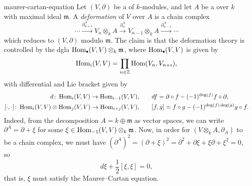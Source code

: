 \begin{example}{maurer-cartan-equation}
    Let $(V, \partial)$ be a  of $k$-modules, and let $A$ be a   over $k$ with maximal ideal $\mathfrak{m}$. A \textit{deformation} of $V$ over $A$ is a chain complex
    \[ \cdots \xrightarrow{\partial^A_{n + 1}} V_n \otimes_k A \xrightarrow{\partial^A_n} V_{n - 1} \otimes_k A \xrightarrow{\partial^A_{n - 1}} \cdots \]
    which reduces to $(V, \partial)$ modulo $\mathfrak{m}$. The claim is that the deformation theory is controlled by the dgla $\Hom_\bdot(V, V) \otimes_k \mathfrak{m}$, where $\Hom_\bdot(V, V)$ is given by
    \[ \operatorname{Hom}_i(V, V) = \prod_{n \in \mathbb{Z}} \operatorname{Hom}(V_n, V_{n + i}) , \]
    with differential and Lie bracket given by
    \[ \begin{aligned}
        d \colon \operatorname{Hom}_i(V, V) \to \operatorname{Hom}_{i - 1}(V, V), &\qquad df = \partial \circ f - (-1)^{\deg(f)} f \circ \partial , \\
        [ \cdot, \cdot ] \colon \operatorname{Hom}_i(V, V) \otimes \operatorname{Hom}_j(V, V) \to \operatorname{Hom}_{i + j}(V, V), &\qquad [f, g] = f \circ g - (-1)^{\deg(f) \deg(g)} g \circ f .
    \end{aligned} \]
    Indeed, from the decomposition $A = k \oplus \mathfrak{m}$ as vector spaces, we can write $\partial^A = \partial + \xi$ for some $\xi \in \operatorname{Hom}_{-1}(V, V) \otimes_k \mathfrak{m}$. Now, in order for $(V \otimes_k A, \partial_A)$ to be a chain complex, we must have $(\partial^A)^2 = (\partial + \xi)^2 = \partial^2 + \partial \xi + \xi \partial + \xi^2 = 0$, so
    \[ d \xi + \frac{1}{2} [\xi, \xi] = 0 , \]
    that is, $\xi$ must satisfy the Maurer--Cartan equation.
\end{example}

